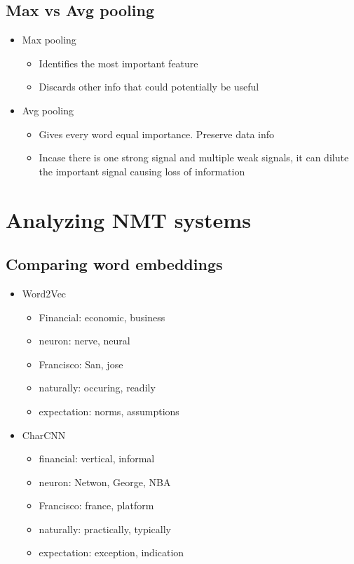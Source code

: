 \documentclass[a4paper]{article}
\begin{document}
\subsection{Max vs Avg pooling}
\begin{itemize}
    \item Max pooling
    \begin{itemize}
        \item Identifies the most important feature
        \item Discards other info that could potentially be useful
    \end{itemize}
    \item Avg pooling
    \begin{itemize}
        \item Gives every word equal importance. Preserve data info
        \item Incase there is one strong signal and multiple weak signals, it can dilute the important signal causing loss of information
    \end{itemize}
\end{itemize}
\section{Analyzing NMT systems}
\subsection{Comparing word embeddings}
\begin{itemize}
    \item Word2Vec
    \begin{itemize}
        \item Financial: economic, business
        \item neuron: nerve, neural
        \item Francisco: San, jose
        \item naturally: occuring, readily
        \item expectation: norms, assumptions
    \end{itemize}
    \item CharCNN
    \begin{itemize}
        \item financial: vertical, informal
        \item neuron: Netwon, George, NBA
        \item Francisco: france, platform
        \item naturally: practically, typically
        \item expectation: exception, indication
    \end{itemize}
\end{itemize}
\end{document}
